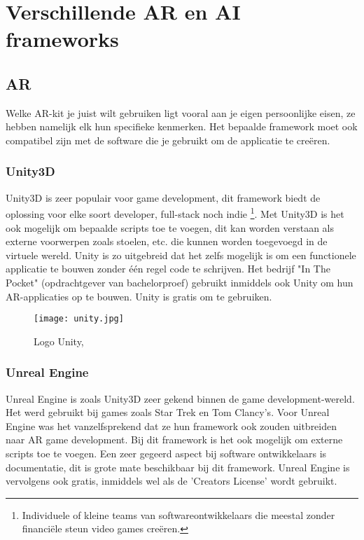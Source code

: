 \section{Verschillende AR en AI frameworks}

\subsection{AR}
Welke AR-kit je juist wilt gebruiken ligt vooral aan je eigen persoonlijke eisen, ze hebben namelijk elk hun specifieke kenmerken. Het bepaalde framework moet ook compatibel zijn met de software die je gebruikt om de applicatie te creëren.
\subsubsection{Unity3D}
Unity3D is zeer populair voor game development, dit framework biedt de oplossing voor elke soort developer, full-stack noch indie \footnote{Individuele of kleine teams van softwareontwikkelaars die meestal zonder financiële steun video games creëren.}. Met Unity3D is het ook mogelijk om bepaalde scripts toe te voegen, dit kan worden verstaan als externe voorwerpen zoals stoelen, etc. die  kunnen worden toegevoegd in de virtuele wereld. Unity is zo uitgebreid dat het zelfs mogelijk is om een functionele applicatie te bouwen zonder één regel code te schrijven. Het bedrijf "In The Pocket" (opdrachtgever van bachelorproef) gebruikt inmiddels ook Unity om hun AR-applicaties op te bouwen. Unity is gratis om te gebruiken. \autocite{Arshed2018}

\begin{figure}[H]
	\centering
	\texttt{[image: unity.jpg]}
	\caption{Logo Unity, \autocite{Unity2019}}
\end{figure}

\subsubsection{Unreal Engine}
Unreal Engine is zoals Unity3D zeer gekend binnen de game development-wereld. Het werd gebruikt bij games zoals Star Trek en Tom Clancy's. Voor Unreal Engine was het vanzelfsprekend dat ze hun framework ook zouden uitbreiden naar 	AR game development. Bij dit framework is het ook mogelijk om externe scripts toe te voegen. Een zeer gegeerd aspect bij software ontwikkelaars is documentatie, dit is grote mate beschikbaar bij dit framework. Unreal Engine is vervolgens ook gratis, inmiddels wel als de 'Creators License'  wordt gebruikt.  \autocite{Arshed2018}

